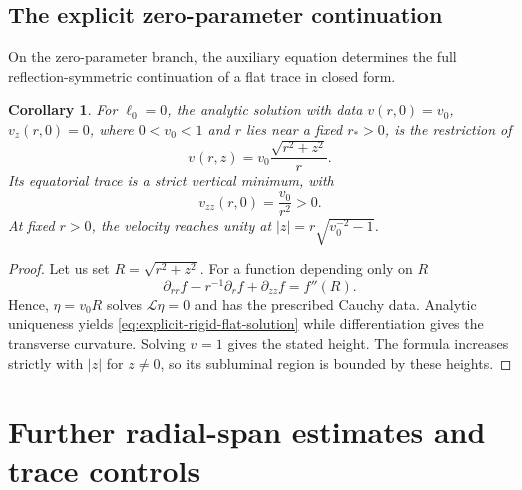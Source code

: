 \documentclass[11pt,a4paper]{article}
\numberwithin{equation}{section}
\theoremstyle{plain}
\newtheorem{corollary}{Corollary}
\theoremstyle{definition}
\theoremstyle{remark}
\newcommand{\ellzero}{\ell_0}
\begin{document}
\subsection{The explicit zero-parameter continuation}

On the zero-parameter branch, the auxiliary equation determines the full reflection-symmetric continuation of a flat trace in closed form.
\begin{corollary}\label{cor:explicit-rigid-flat-continuation}
For $\ellzero=0$, the analytic solution with data
$v(r,0)=v_0$, $v_z(r,0)=0$, where $0<v_0<1$ and $r$ lies near a
fixed $r_*>0$, is the restriction of
\begin{equation}\label{eq:explicit-rigid-flat-solution}
v(r,z)=v_0\frac{\sqrt{r^2+z^2}}{r}.
\end{equation}
Its equatorial trace is a strict vertical minimum, with
\begin{equation}\label{eq:rigid-flat-trace-minimum}
v_{zz}(r,0)=\frac{v_0}{r^2}>0.
\end{equation}
At fixed $r>0$, the velocity reaches unity at $|z|=r\sqrt{v_0^{-2}-1}$.
\end{corollary}
\begin{proof}
Let us set $R=\sqrt{r^2+z^2}$. For a function depending only on $R$
\begin{equation}
\partial_{rr}f-r^{-1}\partial_rf+\partial_{zz}f=f''(R).
\end{equation}
Hence, $\eta=v_0R$ solves $\mathcal L\eta=0$ and has the prescribed
Cauchy data. Analytic uniqueness yields \eqref{eq:explicit-rigid-flat-solution} while 
differentiation gives the transverse curvature. Solving $v=1$
gives the stated height. The formula increases strictly with $|z|$
for $z\neq 0$, so its subluminal region is bounded by these heights.
\end{proof}

\section{Further radial-span estimates and trace controls}
\label{supp:span-analysis}
\end{document}
